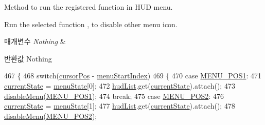 Method to run the registered function in H\+U\+D menu. 

Run the selected function , to disable other menu icon. 
\begin{DoxyParams}{매개변수}
{\em Nothing} & \\
\hline
\end{DoxyParams}
\begin{DoxyReturn}{반환값}
Nothing 
\end{DoxyReturn}

\begin{DoxyCode}
467   \{
468     \textcolor{keywordflow}{switch}(\hyperlink{classkr_1_1ac_1_1kookmin_1_1cs_1_1hud_1_1_h_u_d_management_a138d02aacf241cd6234acfc9512f78aa}{cursorPos} - \hyperlink{classkr_1_1ac_1_1kookmin_1_1cs_1_1hud_1_1_h_u_d_management_ab9d252f0b80e76c4930b8e0fd288f019}{menuStartIndex})
469     \{
470       \textcolor{keywordflow}{case} \hyperlink{classkr_1_1ac_1_1kookmin_1_1cs_1_1hud_1_1_h_u_d_management_a3945824c1d285a532b81075debe3a8cf}{MENU\_POS1}:
471         \hyperlink{classkr_1_1ac_1_1kookmin_1_1cs_1_1hud_1_1_h_u_d_management_a6e135a288ebdc4381eb971ab03d0bd6e}{currentState} = \hyperlink{classkr_1_1ac_1_1kookmin_1_1cs_1_1hud_1_1_h_u_d_management_a1f856e5328f0219dbb586c5297b6b62b}{menuState}[0];
472         \hyperlink{classkr_1_1ac_1_1kookmin_1_1cs_1_1hud_1_1_h_u_d_management_a9eec206ae0d3464de9e92243ae0aba24}{hudList}.get(\hyperlink{classkr_1_1ac_1_1kookmin_1_1cs_1_1hud_1_1_h_u_d_management_a6e135a288ebdc4381eb971ab03d0bd6e}{currentState}).attach();
473         \hyperlink{classkr_1_1ac_1_1kookmin_1_1cs_1_1hud_1_1_h_u_d_management_a88d77a9d61e931e5b8460e7bfaa9558f}{disableMenu}(\hyperlink{classkr_1_1ac_1_1kookmin_1_1cs_1_1hud_1_1_h_u_d_management_a3945824c1d285a532b81075debe3a8cf}{MENU\_POS1});
474         \textcolor{keywordflow}{break};
475       \textcolor{keywordflow}{case} \hyperlink{classkr_1_1ac_1_1kookmin_1_1cs_1_1hud_1_1_h_u_d_management_a2543a9a44db444550bd334d354616928}{MENU\_POS2}:
476         \hyperlink{classkr_1_1ac_1_1kookmin_1_1cs_1_1hud_1_1_h_u_d_management_a6e135a288ebdc4381eb971ab03d0bd6e}{currentState} = \hyperlink{classkr_1_1ac_1_1kookmin_1_1cs_1_1hud_1_1_h_u_d_management_a1f856e5328f0219dbb586c5297b6b62b}{menuState}[1];
477         \hyperlink{classkr_1_1ac_1_1kookmin_1_1cs_1_1hud_1_1_h_u_d_management_a9eec206ae0d3464de9e92243ae0aba24}{hudList}.get(\hyperlink{classkr_1_1ac_1_1kookmin_1_1cs_1_1hud_1_1_h_u_d_management_a6e135a288ebdc4381eb971ab03d0bd6e}{currentState}).attach();
478         \hyperlink{classkr_1_1ac_1_1kookmin_1_1cs_1_1hud_1_1_h_u_d_management_a88d77a9d61e931e5b8460e7bfaa9558f}{disableMenu}(\hyperlink{classkr_1_1ac_1_1kookmin_1_1cs_1_1hud_1_1_h_u_d_management_a2543a9a44db444550bd334d354616928}{MENU\_POS2});

\end{DoxyCode}
